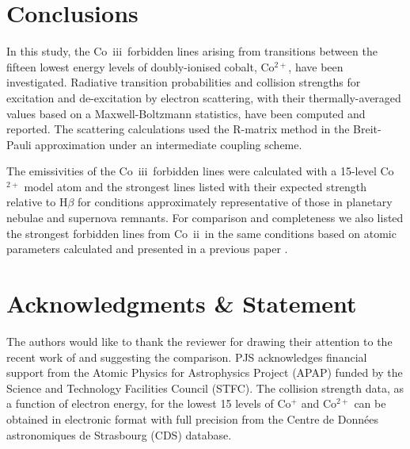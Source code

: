 \documentclass[useAMS,usenatbib]{mn2e}
\newcommand{\II}      {~{\sc ii}}
\newcommand{\III}     {~{\sc iii}}
\begin{document}
\section{Conclusions} \label{Conclusions}

In this study, the Co\III\ forbidden lines arising from transitions between the fifteen lowest
energy levels of doubly-ionised cobalt, Co$^{2+}$, have been investigated. Radiative transition
probabilities and collision strengths for excitation and de-excitation by electron scattering, with
their thermally-averaged values based on a Maxwell-Boltzmann statistics, have been computed and
reported. The scattering calculations used the R-matrix method in the Breit-Pauli approximation
under an intermediate coupling scheme.

The emissivities of the Co\III\ forbidden lines were calculated with a 15-level Co$^{2+}$ model
atom and the strongest lines listed with their expected strength relative to H$\beta$ for
conditions approximately representative of those in planetary nebulae and supernova remnants. For
comparison and completeness we also listed the strongest forbidden lines from Co\II\ in the same
conditions based on atomic parameters calculated and presented in a previous paper
\citep{StoreyZS15}.

\section{Acknowledgments \& Statement}

The authors would like to thank the reviewer for drawing their attention to the recent work of
\citet{FivetQB2016} and suggesting the comparison. PJS acknowledges financial support from the
Atomic Physics for Astrophysics Project (APAP) funded by the Science and Technology Facilities
Council (STFC). The collision strength data, as a function of electron energy, for the lowest 15
levels of Co$^{+}$ and Co$^{2+}$ can be obtained in electronic format with full precision from the
Centre de Donn\'{e}es astronomiques de Strasbourg (CDS) database.
\end{document}
